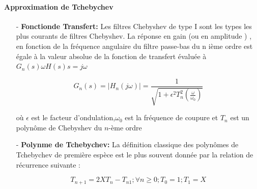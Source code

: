\documentclass[conference,onecolumn]{IEEEtran}
\begin{document}
\paragraph{Approximation de Tchebychev}
\hfill
\medskip
\begin{itemize}
    \item[-] \textbf{Fonctionde Transfert:}
    Les filtres Chebyshev de type I sont les types les plus courants de filtres Chebyshev. La réponse en gain (ou en amplitude ) , en fonction de la fréquence angulaire du filtre passe-bas du n ième ordre est égale à la valeur absolue de la fonction de transfert évaluée à $G_n(s)\omega H(s)s = j\omega$

        \begin{equation}
            G_n(s) = |H_n(j\omega)| = \frac{1}{\sqrt{1 + \epsilon^2T_n^2(\frac{\omega}{\omega_0})}}
        \end{equation}

        où $\epsilon$ est le facteur d'ondulation,$\omega_0$ est la fréquence de coupure et $T_n$ est un polynôme de Chebyshev du $n$-ème ordre
    
        \item[-] \textbf{Polynme de Tchebychev:}
        La définition classique des polynômes de Tchebychev de première espèce est le plus souvent donnée par la relation de récurrence suivante :

            \begin{equation}
                T_{n+1} = 2XT_n - T_{n1}; \forall n \geq 0; T_0 = 1;  T_1 = X
            \end{equation}
 
\end{itemize}
\end{document}
